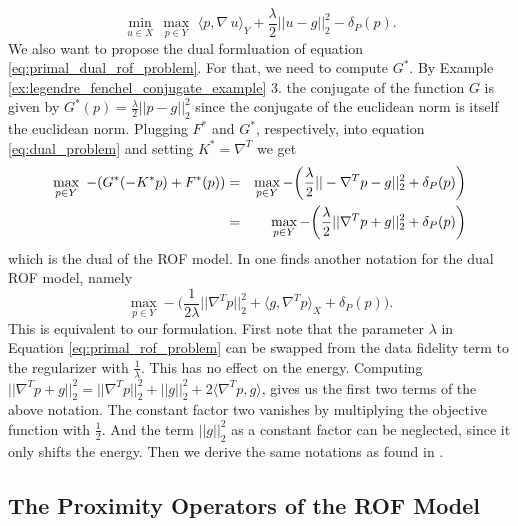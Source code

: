             \begin{equation}
                \min_{u \in X}\, \max_{p \in Y}\,\, \langle p, \nabla\, u \rangle_{Y} + \frac{\lambda}{2} ||u - g||_{2}^{2} - \delta_{P}(p).
            \label{eq:primal_dual_rof_problem}
            \end{equation}
        We also want to propose the dual formluation of equation \ref{eq:primal_dual_rof_problem}. For that, we need to compute $G^{\ast}$. By Example \ref{ex:legendre_fenchel_conjugate_example} 3. the conjugate of the function $G$ is given by $G^{\ast}(p) = \frac{\lambda}{2}||p - g||_{2}^{2}$ since the conjugate of the euclidean norm is itself the euclidean norm. Plugging $F^{\ast}$ and $G^{\ast}$, respectively, into equation \ref{eq:dual_problem} and setting $K^{\ast} = \nabla^{T}$ we get
            \begin{eqnarray}
                \max_{p \in Y}\,\, -(G^{\ast}(-K^{\ast}p) + F^{\ast}(p)) &=& \max_{p \in Y} -\bigg( \frac{\lambda}{2}||-\nabla^{T}p - g||_{2}^{2} + \delta_{P}(p) \bigg) \notag \\
                &=& \max_{p \in Y} -\bigg( \frac{\lambda}{2}||\nabla^{T}p + g||_{2}^{2} + \delta_{P}(p) \bigg)
            \label{eq:dual_rof_problem}
            \end{eqnarray}
        which is the dual of the ROF model. In \cite{Chambolle10afirst-order} one finds another notation for the dual ROF model, namely
            $$
                \max_{p \in Y} - \bigg( \frac{1}{2\lambda} ||\nabla^{T}p||^{2}_{2} + \langle g, \nabla^{T}p \rangle_{X} + \delta_{P}(p) \bigg).
            $$
        This is equivalent to our formulation. First note that the parameter $\lambda$ in Equation \ref{eq:primal_rof_problem} can be swapped from the data fidelity term to the regularizer with $\frac{1}{\lambda}$. This has no effect on the energy. Computing $||\nabla^{T}p + g||_{2}^{2} = ||\nabla^{T}p||_{2}^{2} + ||g||_{2}^{2} + 2 \langle \nabla^{T}p, g \rangle$, gives us the first two terms of the above notation. The constant factor two vanishes by multiplying the objective function with $\frac{1}{2}$. And the term $||g||_{2}^{2}$ as a constant factor can be neglected, since it only shifts the energy. Then we derive the same notations as found in \cite{Chambolle10afirst-order}.


    \subsection{The Proximity Operators of the ROF Model} %
    \label{sub:the_proximity_operators_for_the_rof_model}

